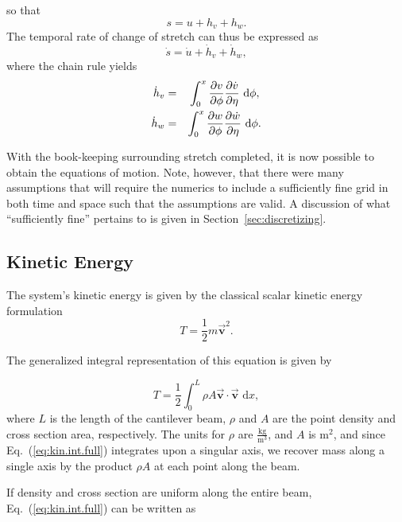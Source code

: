 so that 
\begin{equation}
s = u+h_v+h_w.
\label{eq:stretch.full}
\end{equation}
The temporal rate of change of stretch can thus be expressed as 
\begin{equation}
\dot s = \dot u + \dot h_v+\dot h_w,
\label{eq:stretch.full.dt}
\end{equation}
where the chain rule yields
\begin{eqnarray}
\dot h_v &=& \int_0^x\frac{\partial v}{\partial\phi}\frac{\partial \dot v}{\partial\eta}\text{ d}\phi,{\vrule width 0in depth .1in}\\
\dot h_w &=& \int_0^x\frac{\partial w}{\partial\phi}\frac{\partial \dot w}{\partial\eta}\text{ d}\phi.
\end{eqnarray}

With the book-keeping surrounding stretch completed, it is now possible to obtain the equations of motion. Note, however, that there were many assumptions that will require the numerics to include a sufficiently fine grid in both time and space such that the assumptions are valid. A discussion of what ``sufficiently fine'' pertains to is given in Section~\ref{sec:discretizing}.

\subsection{Kinetic Energy}
The system's kinetic energy is given by the classical scalar kinetic energy formulation
\begin{equation}
T = \frac{1}{2}m\vec{\textbf{v}}^2.
\label{eq:kin.scalar}
\end{equation}

\noindent The generalized integral representation of this equation is given by

\begin{equation}
T = \frac{1}{2}\int_{0}^{L}\rho A \vec{\textbf{v}}\cdot\vec{\textbf{v}}\text{ d}x,
\label{eq:kin.int.full}
\end{equation}
where $L$ is the length of the cantilever beam, $\rho$ and $A$ are the point density and cross section area, respectively. The units for $\rho$ are $\frac{\text{kg}}{\text{m}^3}$, and $A$ is $\text{m}^2$, and since Eq.~(\ref{eq:kin.int.full}) integrates upon a singular axis, we recover mass along a single axis by the product $\rho A$ at each point along the beam.

If density and cross section are uniform along the entire beam, Eq.~(\ref{eq:kin.int.full}) can be written as


